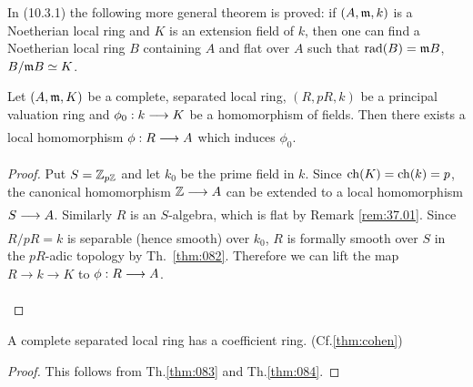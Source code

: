 \documentclass[../main]{subfiles}
\begin{document}
\begin{remark}
\label{rem:37.02}
    In \cite{egaIII} (10.3.1) the following more general theorem is proved: if $(A,\mathfrak{m},k)$ is a Noetherian local ring and $K$ is an extension field of $k$, then one can find a Noetherian local ring $B$ containing $A$ and flat over $A$ such that $\operatorname{rad}(B) = \mathfrak{m}B$, $B/\mathfrak{m}B \simeq K$.
\end{remark}
\begin{theorem}
\label{thm:084}
    Let $(A,\mathfrak{m},K)$ be a complete, separated local ring, $(R,pR,k)$ be a principal valuation ring and $\phi_0: k\varrightarrow{} K$ be a homomorphism of fields. Then there exists a local homomorphism $\phi: R \varrightarrow{} A$ which induces $\phi_0$.
\end{theorem}
\begin{proof}
    Put $S = \mathbb{Z}_{p\mathbb{Z}}$ and let $k_0$ be the prime field in $k$. Since $\operatorname{ch}(K) = \operatorname{ch}(k) = p$, the canonical homomorphism $\bZ \varrightarrow{} A$ can be extended to a local homomorphism $S\varrightarrow{} A$. Similarly $R$ is an $S$-algebra, which is flat by Remark \ref{rem:37.01}. Since $R/pR = k$ is separable (hence smooth) over $k_0$, $R$ is formally smooth over $S$ in the $pR$-adic topology by Th.~\ref{thm:082}. Therefore we can lift the map $R\longrightarrow k\longrightarrow K$ to $\phi: R\varrightarrow{}A$. 
    \begin{center}
    \end{center}
\end{proof}

\begin{theorem}
\label{thm:085}
    A complete separated local ring has a coefficient ring. (Cf.\ref{thm:cohen})
\end{theorem}
\begin{proof}
    This follows from Th.\ref{thm:083} and Th.\ref{thm:084}.
\end{proof}
\end{document}

